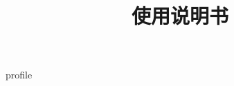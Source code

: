 \documentclass[CJK, hyperref, oneside]{z-book}
\title {\modtitle \\ 使用说明书}
\begin{document}
\date{}
\maketitle

\tableofcontents
{
    \let\clearpage\relax
    \listoftables
    \listoffigures
}
\clearpage
\setcounter{page}{10001}

\def\DIRNAME{.}
{profile}


%    
\end{document}
